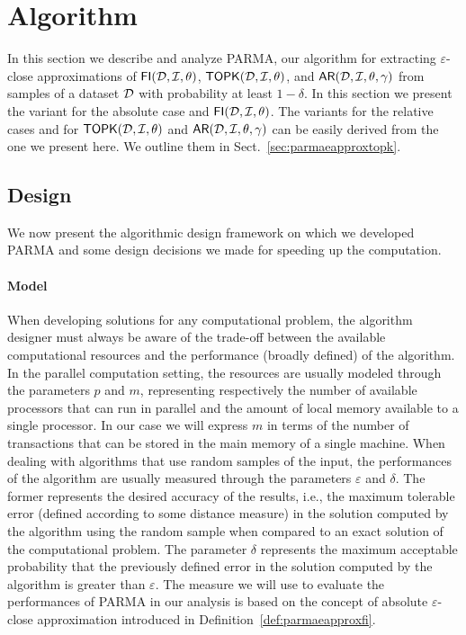 \section{Algorithm}
\label{sec:parmaparmaalgo}
In this section we describe and analyze PARMA, our algorithm for extracting
$\varepsilon$-close approximations of $\mathsf{FI}({\cal D},{\cal I},\theta)$,
$\mathsf{TOPK}({\cal D},{\cal I},\theta)$, and $\mathsf{AR}({\cal D},{\cal I},\theta,\gamma)$ from samples of a dataset
${\cal D}$ with probability at least $1-\delta$. In this section we present the
variant for the absolute case and $\mathsf{FI}({\cal D},{\cal I},\theta)$. The variants for the
relative cases and for $\mathsf{TOPK}({\cal D},{\cal I},\theta)$ and
$\mathsf{AR}({\cal D},{\cal I},\theta,\gamma)$ can be easily derived from the one
we present here. We outline them in Sect.~\ref{sec:parmaeapproxtopk}. 

\subsection{Design}\label{subsec:parmadesign}
We now present the algorithmic design framework on which we developed PARMA and
some design decisions we made for speeding up the computation. 

\paragraph*{Model}When developing solutions for any computational problem,
the algorithm designer must always be aware of the trade-off between the available
computational resources and the performance (broadly defined) of the algorithm.
In the parallel computation setting, the resources are usually modeled through
the parameters $p$ and $m$, representing respectively the number of available
processors that can run in parallel and the amount of local memory available to
a single processor. In our case we will express $m$ in terms of the number of
transactions that can be stored in the main memory of a single machine.
When dealing with algorithms that use random samples of the input, the
performances of the algorithm are usually measured through the parameters
$\varepsilon$ and $\delta$. The former represents the desired accuracy of the
results, i.e., the maximum tolerable error (defined according to some distance
measure) in the solution computed by the algorithm using the random sample
when compared to an exact solution of the computational problem. The parameter
$\delta$ represents the maximum acceptable probability that the previously
defined error in the solution computed by the algorithm is greater than
$\varepsilon$. The measure we will use to evaluate the performances of PARMA in
our analysis is based on the concept of absolute $\varepsilon$-close
approximation introduced in Definition~\ref{def:parmaeapproxfi}.


